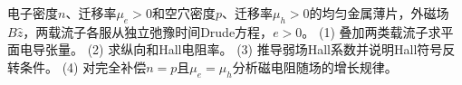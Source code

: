 电子密度\(n\)、迁移率\(\mu_e>0\)和空穴密度\(p\)、迁移率\(\mu_h>0\)的均匀金属薄片，外磁场\(B\hat z\)，两载流子各服从独立弛豫时间Drude方程，\(e>0\)。
(1) 叠加两类载流子求平面电导张量。
(2) 求纵向和Hall电阻率。
(3) 推导弱场Hall系数并说明Hall符号反转条件。
(4) 对完全补偿\(n=p\)且\(\mu_e=\mu_h\)分析磁电阻随场的增长规律。
